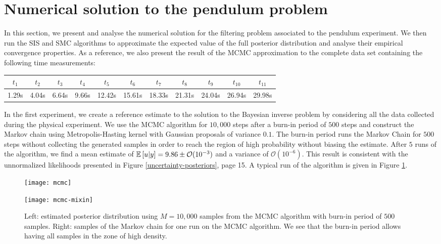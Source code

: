 \section{Numerical solution to the pendulum problem}
In this section, we present and analyse the numerical solution for the filtering problem associated to the pendulum experiment. We then run the SIS and SMC algorithms to approximate the expected value of the full posterior distribution and analyse their empirical convergence properties. As a reference, we also present the result of the MCMC approximation to the complete data set containing the following time measurements:

\begin{table}[h]
  \begin{center}
    \begin{tabular}{|c c c c c c c c c c c|}
      \hline $t_1$ & $t_2$ & $t_3$ & $t_4$ & $t_5$ & $t_6$ & $t_7$ & $t_8$ & $t_9$ & $t_{10}$ & $t_{11}$ \\
      \hline
      1.29s & 4.04s & 6.64s & 9.66s & 12.42s & 15.61s & 18.33s & 21.31s & 24.04s & 26.94s & 29.98s \\
      \hline
    \end{tabular}
  \end{center}
\end{table}

In the first experiment, we create a reference estimate to the solution to the Bayesian inverse problem by considering all the data collected during the physical experiment. We use the MCMC algorithm for $10,000$ steps after a burn-in period of $500$ steps and construct the Markov chain using Metropolis-Hasting kernel with Gaussian proposals of variance $0.1$. The burn-in period runs the Markov Chain for $500$ steps without collecting the generated samples in order to reach the region of high probability without biasing the estimate. After $5$ runs of the algorithm, we find a mean estimate of $\mathbb{E}\left[u|y\right] = 9.86 \pm \mathcal{O}(10^{-3})$ and a variance of $\mathcal{O}(10^{-6})$. This result is consistent with the unnormalized likelihoods presented in Figure \ref{uncertainty-posteriors}, page 15. A typical run of the algorithm is given in Figure \ref{mcmc-figure}.

\begin{figure}[!t]
  \begin{minipage}{.43\textwidth}
    \texttt{[image: mcmc]}
  \end{minipage}
  \begin{minipage}{.5\textwidth}
    \texttt{[image: mcmc-mixin]}
  \end{minipage}
  \caption{Left: estimated posterior distribution using $M=10,000$ samples from the MCMC algorithm with burn-in period of $500$ samples. Right: samples of the Markov chain for one run on the MCMC algorithm. We see that the burn-in period allows having all samples in the zone of high density.}
  \label{mcmc-figure}
\end{figure}

